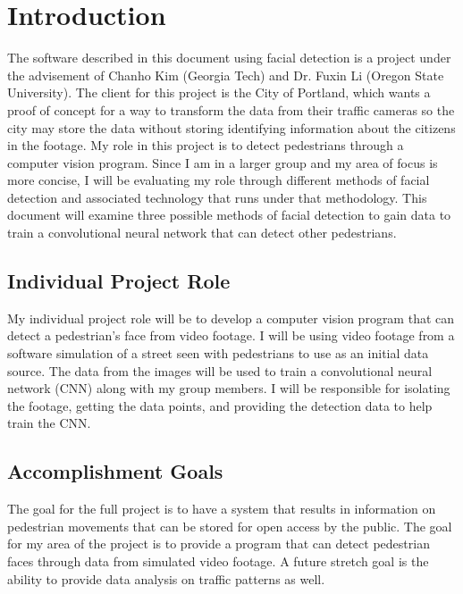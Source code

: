 \documentclass[onecolumn, draftclsnofoot,10pt, compsoc]{IEEEtran}
\begin{document}
\section{Introduction}
The software described in this document using facial detection is a project under the advisement of Chanho Kim (Georgia Tech) and Dr. Fuxin Li (Oregon State University). The client for this project is the City of Portland, which wants a proof of concept for a way to transform the data from their traffic cameras so the city may store the data without storing identifying information about the citizens in the footage. My role in this project is to detect pedestrians through a computer vision program. Since I am in a larger group and my area of focus is more concise, I will be evaluating my role through different methods of facial detection and associated technology that runs under that methodology. This document will examine three possible methods of facial detection to gain data to train a convolutional neural network that can detect other pedestrians.

\subsection{Individual Project Role}
My individual project role will be to develop a computer vision program that can detect a pedestrian's face from video footage. I will be using video footage from a software simulation of a street seen with pedestrians to use as an initial data source. The data from the images will be used to train a convolutional neural network (CNN) along with my group members. I will be responsible for isolating the footage, getting the data points, and providing the detection data to help train the CNN. 

\subsection{Accomplishment Goals}
The goal for the full project is to have a system that results in information on pedestrian movements that can be stored for open access by the public. The goal for my area of the project is to provide a program that can detect pedestrian faces through data from simulated video footage. A future stretch goal is the ability to provide data analysis on traffic patterns as well. 
\end{document}
